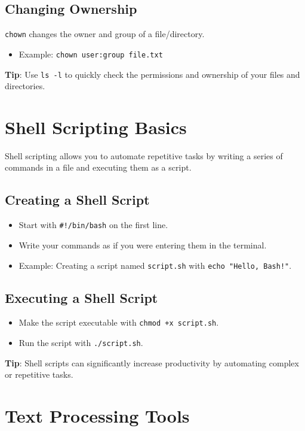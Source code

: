 \documentclass[12pt]{article}
\begin{document}
\subsection{Changing Ownership}
\texttt{chown} changes the owner and group of a file/directory.
\begin{itemize}
    \item Example: \texttt{chown user:group file.txt}
\end{itemize}

\noindent \textbf{Tip}: Use \texttt{ls -l} to quickly check the permissions and ownership of your files and directories.

\section{Shell Scripting Basics}

Shell scripting allows you to automate repetitive tasks by writing a series of commands in a file and executing them as a script.

\subsection{Creating a Shell Script}
\begin{itemize}
    \item Start with \texttt{\#!/bin/bash} on the first line.
    \item Write your commands as if you were entering them in the terminal.
    \item Example: Creating a script named \texttt{script.sh} with \texttt{echo "Hello, Bash!"}.
\end{itemize}

\subsection{Executing a Shell Script}
\begin{itemize}
    \item Make the script executable with \texttt{chmod +x script.sh}.
    \item Run the script with \texttt{./script.sh}.
\end{itemize}

\noindent \textbf{Tip}: Shell scripts can significantly increase productivity by automating complex or repetitive tasks.

\section{Text Processing Tools}
\end{document}
